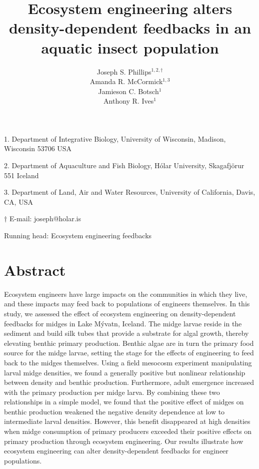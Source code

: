 \documentclass[12pt]{article}
\title{Ecosystem engineering alters density-dependent feedbacks in an aquatic insect population}
\author{
Joseph S. Phillips$^{1,2,\dagger}$ \\
Amanda R. McCormick$^{1,3}$ \\
Jamieson C. Botsch$^{1}$ \\
Anthony R. Ives$^{1}$}
\date{}
\begin{document}
\raggedright
\setlength\parindent{0.25in}

\maketitle

\noindent{} 1. Department of Integrative Biology, University of Wisconsin, Madison, Wisconsin 53706 USA

\noindent{} 2. Department of Aquaculture and Fish Biology, H\'{o}lar University, Skagafj\"{o}r{\dh}ur 551 Iceland

\noindent{} 3. Department of Land, Air and Water Resources, 
University of California, Davis, CA, USA

\noindent{} $\dagger$ E-mail: joseph@holar.is

\bigskip

Running head: {Ecosystem engineering feedbacks}

\linenumbers{}

\clearpage






\section*{Abstract}

Ecosystem engineers have large impacts on the communities in which they live,
and these impacts may feed back to populations of engineers themselves.
In this study, we assessed the effect of ecosystem engineering 
on density-dependent feedbacks for midges in Lake M\'{y}vatn, Iceland. 
The midge larvae reside in the sediment and build silk tubes that provide 
a substrate for algal growth, thereby elevating benthic primary production.
Benthic algae are in turn the primary food source for the midge larvae,
setting the stage for the effects of engineering to feed back to the midges themselves.
Using a field mesocosm experiment manipulating larval midge densities,
we found a generally positive but nonlinear relationship between
density and benthic production.
Furthermore, 
adult emergence increased with the primary production per midge larva.
By combining these two relationships in a simple model,
we found that the positive effect of midges on benthic production 
weakened the negative density dependence at low to intermediate larval densities.
However, this benefit disappeared at high densities when midge consumption 
of primary producers exceeded their positive effects 
on primary production through ecosystem engineering.
Our results illustrate how ecosystem engineering can alter 
density-dependent feedbacks for engineer populations.
\end{document}
